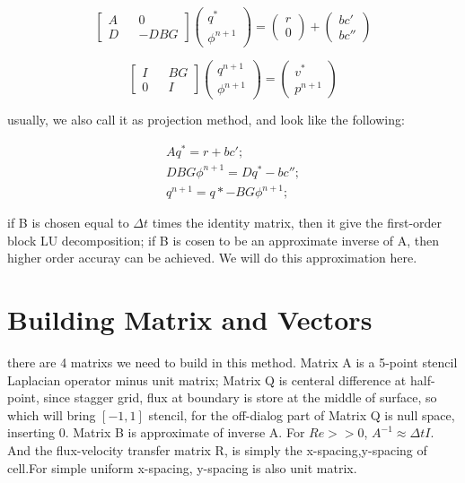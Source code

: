 \documentclass[11pt]{article}
\begin{document}
$$ 
\begin{bmatrix} A && 0 \\ D && -DBG \end{bmatrix} \begin{pmatrix} q^* \\ \phi ^{n+1} \end{pmatrix} = \left( \begin{array}{c} r \\ 0 \end{array} \right) + \left ( \begin{array}{c} bc' \\ bc'' \end{array} \right) $$

$$ 
\begin{bmatrix} I &&  BG \\ 0 && I \end{bmatrix} \begin{pmatrix} q^{n+1} \\ \phi ^{n+1} \end{pmatrix} = \left( \begin{array}{c} v^* \\ p^{n+1} \end{array} \right) $$

usually, we also call it as projection method, and look like the following:

\begin{align}
	A q^* = r + bc';
	\\ DBG \phi ^{n+1} = D q^* - bc'' ;
  	\\ q^{n+1} = q* - BG \phi ^{n+1};
\end{align}

if B is chosen equal to $\Delta t$ times the identity matrix, then it give the first-order block LU decomposition;
if B is cosen to be an approximate inverse of A, then higher order accuray can be achieved. We will do this approximation here.

\section{Building Matrix and Vectors}

there are 4 matrixs we need to build in this method. Matrix A is a 5-point stencil Laplacian operator minus unit matrix; Matrix Q is centeral difference at half-point, since stagger grid, flux at boundary is store at the middle of surface, so which will bring $[-1, 1]$ stencil, for the off-dialog part of Matrix Q is null space, inserting 0. Matrix B is approximate of inverse A. For $Re>>0$, $A^{-1} \approx \Delta t I$. And the flux-velocity transfer matrix R, is simply the x-spacing,y-spacing of cell.For simple uniform x-spacing, y-spacing is also unit matrix. 
\end{document}
